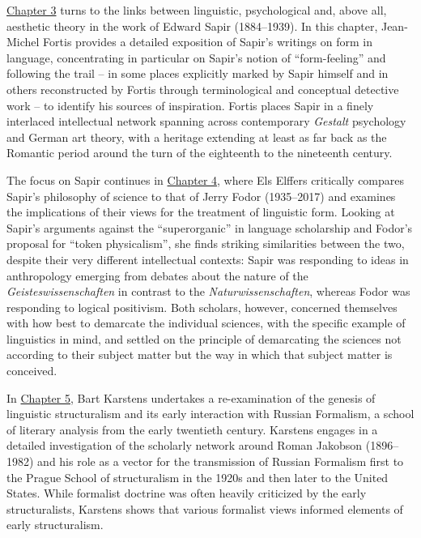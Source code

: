 \documentclass[output=paper]{langscibook}
\begin{document}
\hyperref[chap:fortis]{Chapter 3} turns to the links between linguistic, psychological and, above all, aesthetic theory in the work of Edward Sapir (1884--1939). In this chapter, Jean-Michel Fortis provides a detailed exposition of Sapir's writings on form in language, concentrating in particular on Sapir's notion of ``form-feeling'' and following the trail -- in some places explicitly marked by Sapir himself and in others reconstructed by Fortis through terminological and conceptual detective work -- to identify his sources of inspiration. Fortis places Sapir in a finely interlaced intellectual network spanning across contemporary \emph{Gestalt} psychology and German art theory, with a heritage extending at least as far back as the Romantic period around the turn of the eighteenth to the nineteenth century.

The focus on Sapir continues in \hyperref[chap:elffers]{Chapter 4}, where Els Elffers critically compares Sapir's philosophy of science to that of Jerry Fodor (1935--2017) and examines the implications of their views for the treatment of linguistic form. Looking at Sapir's arguments against the ``superorganic'' in language scholarship and Fodor's proposal for ``token physicalism'', she finds striking similarities between the two, despite their very different intellectual contexts: Sapir was responding to ideas in anthropology emerging from debates about the nature of the \emph{Geisteswissenschaften} in contrast to the \emph{Naturwissenschaften}, whereas Fodor was responding to logical positivism. Both scholars, however, concerned themselves with how best to demarcate the individual sciences, with the specific example of linguistics in mind, and settled on the principle of demarcating the sciences not according to their subject matter but the way in which that subject matter is conceived.

In \hyperref[chap:karstens]{Chapter 5}, Bart Karstens undertakes a re-examination of the genesis of linguistic structuralism and its early interaction with Russian Formalism, a school of literary analysis from the early twentieth century. Karstens engages in a detailed investigation of the scholarly network around Roman Jakobson (1896--1982) and his role as a vector for the transmission of Russian Formalism first to the Prague School of structuralism in the 1920s and then later to the United States. While formalist doctrine was often heavily criticized by the early structuralists, Karstens shows that various formalist views informed elements of early structuralism.
\end{document}
